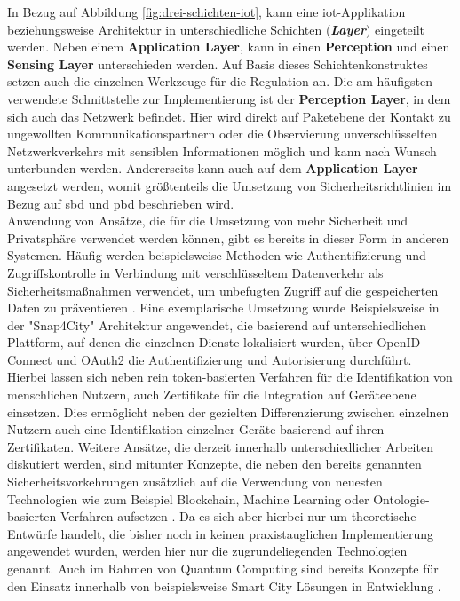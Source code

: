 In Bezug auf Abbildung \ref{fig:drei-schichten-iot}, kann eine \ac{iot}-Applikation beziehungsweise Architektur in unterschiedliche Schichten (\textbf{\textit{Layer}}) eingeteilt werden. Neben einem \textbf{Application Layer}, kann in einen \textbf{Perception} und einen \textbf{Sensing Layer} unterschieden werden. 
Auf Basis dieses Schichtenkonstruktes setzen auch die einzelnen Werkzeuge für die Regulation an. Die am häufigsten verwendete Schnittstelle zur Implementierung ist der \textbf{Perception Layer}, in dem sich auch das Netzwerk befindet. 
Hier wird direkt auf Paketebene der Kontakt zu ungewollten Kommunikationspartnern oder die Observierung unverschlüsselten Netzwerkverkehrs mit sensiblen Informationen möglich und kann nach Wunsch unterbunden werden. Andererseits kann auch auf dem \textbf{Application Layer} angesetzt werden, womit größtenteils die Umsetzung von Sicherheitsrichtlinien im Bezug auf \ac{sbd} und \ac{pbd} beschrieben wird.\\
Anwendung von Ansätze, die für die Umsetzung von mehr Sicherheit und Privatsphäre verwendet werden können, gibt es bereits in dieser Form in anderen Systemen. Häufig werden beispielsweise Methoden wie Authentifizierung und Zugriffskontrolle in Verbindung mit verschlüsseltem Datenverkehr als Sicherheitsmaßnahmen verwendet, um unbefugten Zugriff auf die gespeicherten Daten zu präventieren \cite{SecPrivSmartCity2021}. 
Eine exemplarische Umsetzung wurde Beispielsweise in der "Snap4City" Architektur \cite{Badii2020} angewendet, die basierend auf unterschiedlichen Plattform, auf denen die einzelnen Dienste lokalisiert wurden, über OpenID Connect und OAuth2 die Authentifizierung und Autorisierung durchführt. 
Hierbei lassen sich neben rein token-basierten Verfahren für die Identifikation von menschlichen Nutzern, auch Zertifikate für die Integration auf Geräteebene einsetzen. 
Dies ermöglicht neben der gezielten Differenzierung zwischen einzelnen Nutzern auch eine Identifikation einzelner Geräte basierend auf ihren Zertifikaten. 
Weitere Ansätze, die derzeit innerhalb unterschiedlicher Arbeiten diskutiert werden, sind mitunter Konzepte, die neben den bereits genannten Sicherheitsvorkehrungen zusätzlich auf die Verwendung von neuesten Technologien wie zum Beispiel Blockchain, Machine Learning oder Ontologie-basierten Verfahren aufsetzen \cite{Cui2018}. Da es sich aber hierbei nur um theoretische Entwürfe handelt, die bisher noch in keinen praxistauglichen Implementierung angewendet wurden, werden hier nur die zugrundeliegenden Technologien genannt. 
Auch im Rahmen von Quantum Computing sind bereits Konzepte für den Einsatz innerhalb von beispielsweise Smart City Lösungen in Entwicklung \cite{Bashirpour2022}.

